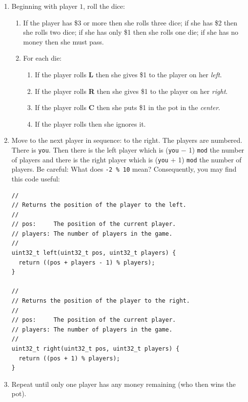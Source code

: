 \documentclass{article}
\begin{document}
\begin{enumerate}
\item
Beginning with player $1$, roll the dice:
\begin{enumerate}
\item
If the player has \$3 or more then she rolls three dice;
if she has \$2 then she rolls two dice;
if she has only \$1 then she rolls one die;
if she has no money then she must pass.

\item For each die:
\begin{enumerate}
\item If the player rolls \textbf{L} then she gives \$1 to the player on her \emph{left}.

\item If the player rolls \textbf{R} then she gives \$1 to the player on her \emph{right}.

\item If the player rolls \textbf{C} then she puts \$1 in the pot in the
    \emph{center}.

\item If the player rolls \textbf{\textbullet} then she ignores it.
\end{enumerate}

\end{enumerate}
\item Move to the next player in sequence: to the
right. The players are numbered. There is \texttt{you}. Then there
is the left player which is (\texttt{you} $-$ 1) \texttt{mod} the number
of players and there is the right player which is (\texttt{you} $+$
1) \texttt{mod} the number of players.
Be careful: What does \texttt{-2 \% 10} mean? Consequently, you may find this code useful:
\begin{lstlisting}
//
// Returns the position of the player to the left.
//
// pos:     The position of the current player.
// players: The number of players in the game.
//
uint32_t left(uint32_t pos, uint32_t players) {
  return ((pos + players - 1) % players);
}

//
// Returns the position of the player to the right.
//
// pos:     The position of the current player.
// players: The number of players in the game.
//
uint32_t right(uint32_t pos, uint32_t players) {
  return ((pos + 1) % players);
}
\end{lstlisting}

\item Repeat until only one player has any money remaining (who then wins the pot).
\end{enumerate}
\end{document}
